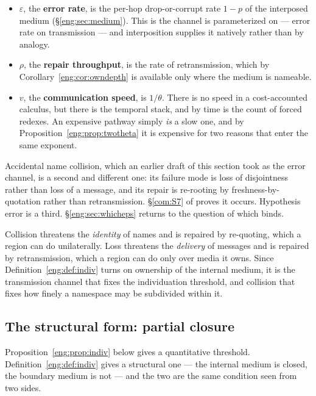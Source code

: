 \begin{itemize}[itemsep=3pt]
\item $\varepsilon$, the \textbf{error rate}, is the per-hop drop-or-corrupt
rate $1-p$ of the interposed medium (\S\ref{eng:sec:medium}). This is the
channel \cite{compaut} is parameterized on --- error rate on transmission
--- and interposition supplies it natively rather than by analogy.
\item $\rho$, the \textbf{repair throughput}, is the rate of
retransmission, which by Corollary~\ref{eng:cor:owndepth} is available only
where the medium is nameable.
\item $v$, the \textbf{communication speed}, is $1/\theta$. There is no
speed in a cost-accounted calculus, but there is the temporal stack, and by
\cite[Prop.~4.1]{CE} time is the count of forced redexes. An expensive
pathway simply \emph{is} a slow one, and by
Proposition~\ref{eng:prop:twotheta} it is expensive for two reasons that enter
the same exponent.
\end{itemize}

Accidental name collision, which an earlier draft of this section took as
the error channel, is a second and different one: its failure mode is loss
of disjointness rather than loss of a message, and its repair is re-rooting
by freshness-by-quotation rather than retransmission. \S\ref{com:S7} of \chComp
proves it occurs. Hypothesis error is a third. \S\ref{eng:sec:whicheps}
returns to the question of which binds.

\begin{remark}\label{eng:why-medium-channel-one}
Collision threatens the \emph{identity} of names and is repaired by
re-quoting, which a region can do unilaterally. Loss threatens the
\emph{delivery} of messages and is repaired by retransmission, which a
region can do only over media it owns. Since Definition~\ref{eng:def:indiv}
turns on ownership of the internal medium, it is the transmission channel
that fixes the individuation threshold, and collision that fixes how
finely a namespace may be subdivided within it.
\end{remark}

\subsection{The structural form: partial closure}\label{eng:S8.2}

Proposition~\ref{eng:prop:indiv} below gives a quantitative threshold.
Definition~\ref{eng:def:indiv} gives a structural one --- the internal medium
is closed, the boundary medium is not --- and the two are the same
condition seen from two sides.

